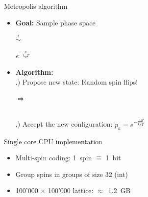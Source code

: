 \documentclass{beamer}
\begin{document}
\begin{frame}{Metropolis algorithm}
\begin{itemize}
    \item \textbf{Goal:} Sample phase space\\
        \vspace{3mm}
        \begin{minipage}[c]{0.4\textwidth}
            
        \end{minipage}
        \begin{minipage}[c]{0.2\textwidth} {\Huge $\stackrel{!}{\sim}$} \end{minipage}
        \begin{minipage}[c]{0.3\textwidth} {\Huge $e^{-\frac{E}{k_B T}}$} \end{minipage} \pause
    \vspace{2mm}
    \item \textbf{Algorithm:}\\ .) Propose new state: Random spin flips!\\
            \vspace{2mm}
            \begin{minipage}{0.3\textwidth}
                
            \end{minipage}
            \hfill
            \begin{minipage}[c]{0.2\textwidth} {\Huge $\Rightarrow$} \end{minipage}
            \begin{minipage}[c]{0.3\textwidth}
                
            \end{minipage}\\ .) Accept the new configuration: $p_a = e^{-\frac{\Delta E}{k_B T}}$
\end{itemize}
\end{frame}

\begin{frame}{Single core CPU implementation}
\begin{itemize}
    \item Multi-spin coding: 1~spin $\mathrel{\widehat{=}}$ 1~bit \pause
    \item Group spins in groups of size 32 (int)
    \item 100'000 $\times$ 100'000 lattice: $\approx$~1.2~GB
\end{itemize}
\end{frame}
\end{document}
